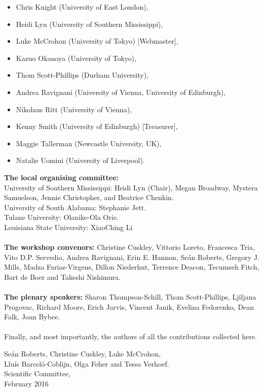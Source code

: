 \documentclass{evolang9_book}
\begin{document}
{\begin{itemize}
\item    Chris Knight (University of East London),
\item    Heidi Lyn (University of Southern Mississippi),
\item    Luke McCrohon (University of Tokyo) [Webmaster],
\item    Kazuo Okanoya (University of Tokyo),
\item    Thom Scott-Phillips (Durham University),
\item    Andrea Ravignani (University of Vienna, University of Edinburgh),
\item    Nikolaus Ritt (University of Vienna),
\item    Kenny Smith (University of Edinburgh) [Treasurer],
\item    Maggie Tallerman (Newcastle University, UK),
\item    Natalie Uomini (University of Liverpool).
\end{itemize}
%
\textbf{The local organising committee:}\\
 University of Southern Mississippi:
 Heidi Lyn (Chair),
 Megan Broadway,
    Mystera Samuelson,
    Jennie Christopher,
 and  Beatrice Chenkin.  \\
University of South Alabama:  Stephanie Jett.\\
Tulane University: Olanike-Ola Orie.  \\
Louisiana State University: XiaoChing Li\\\\
%
%
%
\textbf{The workshop convenors:}
Christine Cuskley, Vittorio Loreto, Francesca Tria, Vito D.P. Servedio, Andrea Ravignani, Erin E. Hannon, Se\'{a}n Roberts, Gregory J. Mills, Madza Farias-Virgens, Dillon Niederhut, Terrence Deacon, Tecumseh Fitch, Bart de Boer and Takeshi Nishimura.\\\\
%
%
\textbf{The plenary speakers:}
Sharon Thompson-Schill, Thom Scott-Phillips, Ljiljana Progovac, Richard Moore, Erich Jarvis, Vincent Janik, Evelina Fedorenko, Dean Falk, Joan Bybee.
%
\\\\
Finally, and most importantly, the authors of all the contributions collected here.
%
\begin{flushright}Se\'{a}n Roberts, Christine Cuskley, Luke McCrohon,\\ Llu\'{i}s Barcel\'{o}-Coblijn, Olga Feher and Tessa Verhoef.
\\ Scientific Committee,
\\February 2016\end{flushright}
}  %
\newpage
\end{document}
